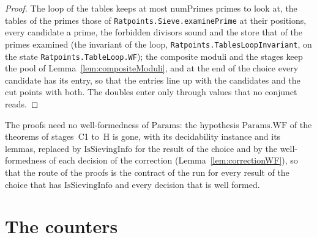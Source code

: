 \begin{proof}
  \leanok
  The loop of the tables keeps at most $\mathrm{numPrimes}$ primes to look at, the tables of the
  primes those of \verb|Ratpoints.Sieve.examinePrime| at their positions, every candidate a prime,
  the forbidden divisors sound and the store that of the primes examined (the invariant of the loop,
  \verb|Ratpoints.TablesLoopInvariant|, on the state \verb|Ratpoints.TableLoop.WF|); the composite
  moduli and the stages keep the pool of Lemma~\ref{lem:compositeModuli}, and at the end of the
  choice every candidate has its entry, so that the entries line up with the candidates and the cut
  points with both. The doubles enter only through values that no conjunct reads.
\end{proof}

The proofs need no well-formedness of $\mathrm{Params}$: the hypothesis $\mathrm{Params.WF}$ of the
theorems of stages~C1 to~H is gone, with its decidability instance and its lemmas, replaced by
$\mathrm{IsSievingInfo}$ for the result of the choice and by the well-formedness of each decision of
the correction (Lemma~\ref{lem:correctionWF}), so that the route of the proofs is the contract of
the run for every result of the choice that has $\mathrm{IsSievingInfo}$ and every decision that is
well formed.

\section{The counters}\label{sec:counters}

